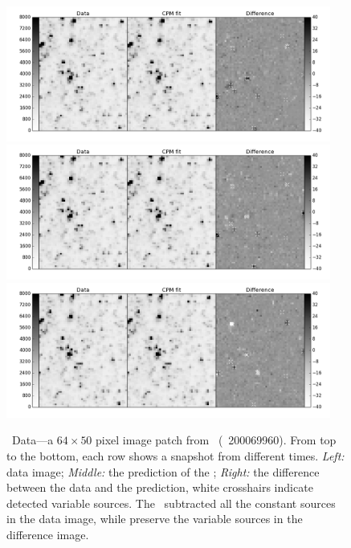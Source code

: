 \begin{figure}[p]
\begin{center}
\includegraphics[width=0.95\textwidth]{figures/cdi/f5a}
\includegraphics[width=0.95\textwidth]{figures/cdi/f5b}
\includegraphics[width=0.95\textwidth]{figures/cdi/f5c}
\end{center}
\caption[The \cpmdiff\ for \KTCN\ data]{
  \label{k2c9}
  \KTCN\ Data---a $64\times 50$ pixel image patch from \KTCN\ (\epic\ 200069960). 
  From top to the bottom,  each row shows a snapshot from different times.
  \emph{Left:} data image;
  \emph{Middle:} the prediction of the \cpmdiff;
  \emph{Right:} the difference between the data and the prediction, white crosshairs indicate detected variable sources.
  The \cpmdiff\ subtracted all the constant sources in the data image, while preserve the variable sources in the difference image.
}
\end{figure}

